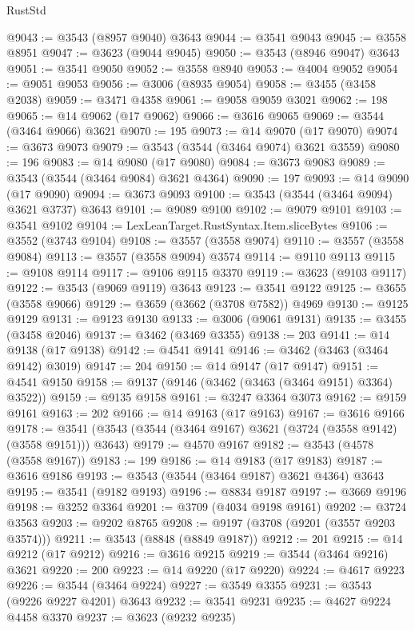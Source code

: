 \begin{lexlean}{RustStd}
\begin{coremodule}
@9043 := @3543 (@8957 @9040) @3643
@9044 := @3541 @9043
@9045 := @3558 @8951
@9047 := @3623 (@9044 @9045)
@9050 := @3543 (@8946 @9047) @3643
@9051 := @3541 @9050
@9052 := @3558 @8940
@9053 := @4004 @9052
@9054 := @9051 @9053
@9056 := @3006 (@8935 @9054)
@9058 := @3455 (@3458 @2038)
@9059 := @3471 @4358
@9061 := @9058 @9059 @3021
@9062 := 198
@9065 := @14 @9062 (@17 @9062)
@9066 := @3616 @9065
@9069 := @3544 (@3464 @9066) @3621
@9070 := 195
@9073 := @14 @9070 (@17 @9070)
@9074 := @3673 @9073
@9079 := @3543 (@3544 (@3464 @9074) @3621 @3559)
@9080 := 196
@9083 := @14 @9080 (@17 @9080)
@9084 := @3673 @9083
@9089 := @3543 (@3544 (@3464 @9084) @3621 @4364)
@9090 := 197
@9093 := @14 @9090 (@17 @9090)
@9094 := @3673 @9093
@9100 := @3543 (@3544 (@3464 @9094) @3621 @3737) @3643
@9101 := @9089 @9100
@9102 := @9079 @9101
@9103 := @3541 @9102
@9104 := LexLeanTarget.RustSyntax.Item.sliceBytes
@9106 := @3552 (@3743 @9104)
@9108 := @3557 (@3558 @9074)
@9110 := @3557 (@3558 @9084)
@9113 := @3557 (@3558 @9094) @3574
@9114 := @9110 @9113
@9115 := @9108 @9114
@9117 := @9106 @9115 @3370
@9119 := @3623 (@9103 @9117)
@9122 := @3543 (@9069 @9119) @3643
@9123 := @3541 @9122
@9125 := @3655 (@3558 @9066)
@9129 := @3659 (@3662 (@3708 @7582)) @4969
@9130 := @9125 @9129
@9131 := @9123 @9130
@9133 := @3006 (@9061 @9131)
@9135 := @3455 (@3458 @2046)
@9137 := @3462 (@3469 @3355)
@9138 := 203
@9141 := @14 @9138 (@17 @9138)
@9142 := @4541 @9141
@9146 := @3462 (@3463 (@3464 @9142) @3019)
@9147 := 204
@9150 := @14 @9147 (@17 @9147)
@9151 := @4541 @9150
@9158 := @9137 (@9146 (@3462 (@3463 (@3464 @9151) @3364) @3522))
@9159 := @9135 @9158
@9161 := @3247 @3364 @3073
@9162 := @9159 @9161
@9163 := 202
@9166 := @14 @9163 (@17 @9163)
@9167 := @3616 @9166
@9178 := @3541 (@3543 (@3544 (@3464 @9167) @3621 (@3724 (@3558 @9142) (@3558 @9151))) @3643)
@9179 := @4570 @9167
@9182 := @3543 (@4578 (@3558 @9167))
@9183 := 199
@9186 := @14 @9183 (@17 @9183)
@9187 := @3616 @9186
@9193 := @3543 (@3544 (@3464 @9187) @3621 @4364) @3643
@9195 := @3541 (@9182 @9193)
@9196 := @8834 @9187
@9197 := @3669 @9196
@9198 := @3252 @3364
@9201 := @3709 (@4034 @9198 @9161)
@9202 := @3724 @3563
@9203 := @9202 @8765
@9208 := @9197 (@3708 (@9201 (@3557 @9203 @3574)))
@9211 := @3543 (@8848 (@8849 @9187))
@9212 := 201
@9215 := @14 @9212 (@17 @9212)
@9216 := @3616 @9215
@9219 := @3544 (@3464 @9216) @3621
@9220 := 200
@9223 := @14 @9220 (@17 @9220)
@9224 := @4617 @9223
@9226 := @3544 (@3464 @9224)
@9227 := @3549 @3355
@9231 := @3543 (@9226 @9227 @4201) @3643
@9232 := @3541 @9231
@9235 := @4627 @9224 @4458 @3370
@9237 := @3623 (@9232 @9235)

\end{coremodule}
\end{lexlean}
